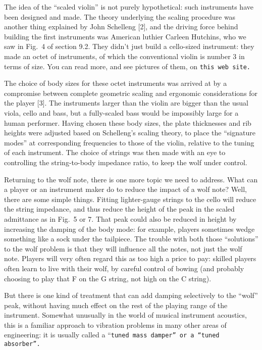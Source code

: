   The idea of the “scaled violin” is not purely hypothetical: such instruments 
  have been designed and made. The theory underlying the scaling procedure was 
  another thing explained by John Schelleng [2], and the driving force behind 
  building the first instruments was American luthier Carleen Hutchins, who we 
  saw in Fig.\ 4 of section 9.2. They didn’t just build a cello-sized 
  instrument: they made an octet of instruments, of which the conventional 
  violin is number 3 in terms of size. You can read more, and see pictures of 
  them, on \tt{}this web site\rm{}. 

  The choice of body sizes for these octet instruments was arrived at by a 
  compromise between complete geometric scaling and ergonomic considerations 
  for the player [3]. The instruments larger than the violin are bigger than 
  the usual viola, cello and bass, but a fully-scaled bass would be impossibly 
  large for a human performer. Having chosen these body sizes, the plate 
  thicknesses and rib heights were adjusted based on Schelleng’s scaling 
  theory, to place the “signature modes” at corresponding frequencies to those 
  of the violin, relative to the tuning of each instrument. The choice of 
  strings was then made with an eye to controlling the string-to-body impedance 
  ratio, to keep the wolf under control. 

  Returning to the wolf note, there is one more topic we need to address. What 
  can a player or an instrument maker do to reduce the impact of a wolf note? 
  Well, there are some simple things. Fitting lighter-gauge strings to the 
  cello will reduce the string impedance, and thus reduce the height of the 
  peak in the scaled admittance as in Fig.\ 5 or 7. That peak could also be 
  reduced in height by increasing the damping of the body mode: for example, 
  players sometimes wedge something like a sock under the tailpiece. The 
  trouble with both those “solutions” to the wolf problem is that they will 
  influence all the notes, not just the wolf note. Players will very often 
  regard this as too high a price to pay: skilled players often learn to live 
  with their wolf, by careful control of bowing (and probably choosing to play 
  that F on the G string, not high on the C string). 

  But there is one kind of treatment that can add damping selectively to the 
  “wolf” peak, without having much effect on the rest of the playing range of 
  the instrument. Somewhat unusually in the world of musical instrument 
  acoustics, this is a familiar approach to vibration problems in many other 
  areas of engineering: it is usually called a “\tt{}tuned mass damper\rm{}” or a “tuned absorber”. 

